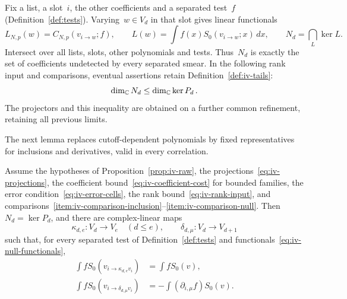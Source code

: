 Fix a list, a slot~$i$, the other coefficients and a separated test~$f$ (Definition~\ref{def:tests}). Varying~$w\in V_d$ in that slot gives linear functionals
\begin{equation}\label{eq:iv-null-functionals}
 L_{N,p}(w)=C_{N,p}(v_{i\to w};f),\qquad
 L(w)=\int f(x)S_0(v_{i\to w};x)\,dx,\qquad
 N_d=\bigcap_L\ker L.
\end{equation}
Intersect over all lists, slots, other polynomials and tests. Thus~$N_d$ is exactly the set of coefficients undetected by every separated smear.
In the following rank input and comparisons, eventual assertions retain Definition~\ref{def:iv-tails}:
\begin{equation}\label{eq:iv-rank-input}
\dim_\mathbb C N_d\le\dim_\mathbb C\ker P_d\,.
\end{equation}
The projectors and this inequality are obtained on a further common refinement, retaining all previous limits.

The next lemma replaces cutoff-dependent polynomials by fixed representatives for inclusions and derivatives, valid in every correlation.

\begin{lemma}\label{lem:iv-representatives}
Assume the hypotheses of Proposition~\ref{prop:iv-raw}, the projections~\eqref{eq:iv-projections}, the coefficient bound~\eqref{eq:iv-coefficient-cost} for bounded families, the error condition~\eqref{eq:iv-error-cells}, the rank bound~\eqref{eq:iv-rank-input}, and comparisons~\ref{item:iv-comparison-inclusion}--\ref{item:iv-comparison-null}.
Then~$N_d=\ker P_d$, and there are complex-linear maps
\begin{equation*}
 \kappa_{d,e}:V_d\longrightarrow V_e\quad(d\le e),\qquad
 \delta_{d,\mu}:V_d\longrightarrow V_{d+1}
\end{equation*}
such that, for every separated test of Definition~\ref{def:tests} and functionals~\eqref{eq:iv-null-functionals},
\begin{equation}\label{eq:iv-weak-identities}
\begin{aligned}
 \int fS_0(v_{i\to\kappa_{d,e}v_i})&=\int fS_0(v),\\
 \int fS_0(v_{i\to\delta_{d,\mu}v_i})&=-\int(\partial_{i,\mu}f)S_0(v).
\end{aligned}
\end{equation}
\end{lemma}

